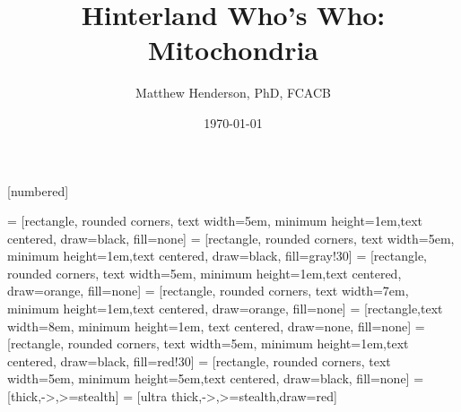 \documentclass[presentation, smaller]{beamer}
\author{Matthew Henderson, PhD, FCACB}
\date{\today}
\title{Hinterland Who's Who: Mitochondria}
\institute[NSO]{Newborn Screening Ontario | The University of Ottawa}
\begin{document}
\maketitle


\vspace{220pt}
\beamertemplatenavigationsymbolsempty
{}[numbered]

 = [rectangle, rounded corners, text width=5em, minimum height=1em,text centered, draw=black, fill=none]
 = [rectangle, rounded corners, text width=5em, minimum height=1em,text centered, draw=black, fill=gray!30]
 = [rectangle, rounded corners, text width=5em, minimum height=1em,text centered, draw=orange, fill=none]
 = [rectangle, rounded corners, text width=7em, minimum height=1em,text centered, draw=orange, fill=none]
 = [rectangle,text width=8em, minimum height=1em, text centered, draw=none, fill=none]
 = [rectangle, rounded corners, text width=5em, minimum height=1em,text centered, draw=black, fill=red!30]
 = [rectangle, rounded corners, text width=5em, minimum height=5em,text centered, draw=black, fill=none]
 = [thick,->,>=stealth]
 = [ultra thick,->,>=stealth,draw=red]
\end{document}
